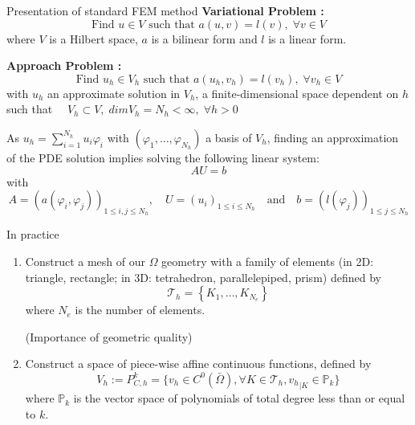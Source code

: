 \documentclass[compress,10pt,xcolor={table,dvipsnames},t]{beamer}
\begin{document}
	\begin{frame}{Presentation of standard FEM method}	
		\textbf{Variational Problem :} 
		\begin{equation*}
			\text{Find } u\in V \text{ such that } a(u,v)=l(v), \;\forall v\in V
		\end{equation*}
		where $V$ is a Hilbert space, $a$ is a bilinear form and $l$ is a linear form.
		
		\textbf{Approach Problem :} 
		\begin{equation*}
			\text{Find } u_h\in V_h \text{ such that } a(u_h,v_h)=l(v_h), \;\forall v_h\in V
		\end{equation*}
		with $u_h$ an approximate solution in $V_h$, a finite-dimensional space dependent on $h$ such that $\quad V_h\subset V, \; dimV_h = N_h<\infty, \; \forall h>0$ 
		
		As $u_h=\sum_{i=1}^{N_h}u_i\varphi_i$ with $(\varphi_1,\dots,\varphi_{N_h})$ a basis of $V_h$, finding an approximation of the PDE solution implies solving the following linear system:
		\begin{equation*}
			AU=b
		\end{equation*}
		with
		\begin{equation*}
			A=(a(\varphi_i,\varphi_j))_{1\le i,j\le N_h}, \quad U=(u_i)_{1\le i\le N_h} \quad \text{and} \quad b=(l(\varphi_j))_{1\le j\le N_h}
		\end{equation*}
	\end{frame}

	\begin{frame}{In practice}
		\begin{enumerate}[\ding{217}]
			\item \begin{minipage}[t]{0.68\linewidth}
				Construct a mesh of our $\Omega$ geometry with a family of elements (in 2D: triangle, rectangle; in 3D: tetrahedron, parallelepiped, prism) defined by
				$$\mathcal{T}_h = \left\{K_1,\dots,K_{N_e}\right\}$$
				where $N_e$ is the number of elements. \\
			\end{minipage} \begin{minipage}[t][][b]{0.28\linewidth}
				\centering
				\qquad {}
			\end{minipage}
			(Importance of geometric quality)
			\item Construct a space of piece-wise affine continuous functions, defined by
			\begin{equation*}
				V_h:=P_{C,h}^k=\{v_h\in C^0(\bar{\Omega}), \forall K\in\mathcal{T}_h, {v_h}_{|K}\in\mathbb{P}_k\}
			\end{equation*}
			where $\mathbb{P}_k$ is the vector space of polynomials of total degree less than or equal to $k$.
		\end{enumerate}
		
	\end{frame}
\end{document}

